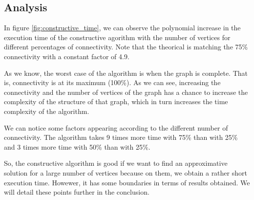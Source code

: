 
\subsection{Analysis}

In figure \ref{fig:constructive_time}, we can observe the polynomial increase in the execution time of the constructive agorithm with the number of vertices for different percentages of connectivity. Note that the theorical is matching the 75\% connectivity with a constant factor of 4.9.
\bigskip

As we know, the worst case of the algorithm is when the graph is complete. That is, connectivity is at its maximum (100\%). As we can see, increasing the connectivity and the number of vertices of the graph has a chance to increase the complexity of the structure of that graph, which in turn increases the time complexity of the algorithm. 
\bigskip

We can notice some factors appearing according to the different number of connectivity. The algorithm takes 9 times more time with 75\% than with 25\% and 3 times more time with 50\% than with 25\%.

So, the constructive algorithm is good if we want to find an approximative solution for a large number of vertices because on them, we obtain a rather short execution time. Howewer, it has some boundaries in terms of results obtained. We will detail these points further in the conclusion.
